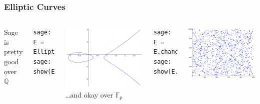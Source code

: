 \documentclass[10pt]{beamer}
\begin{document}
\begin{frame}
\frametitle{Elliptic Curves}

\begin{columns}
Sage is pretty good over $\mathbb{Q}$
\begin{lstlisting}
sage: E = EllipticCurve("37a")
sage: show(E.plot())
\end{lstlisting}
\includegraphics[width=1\textwidth]{elliptic_curve_over_q.png}
\dots and okay over  $\mathbb{F}_p$
\begin{lstlisting}
sage: E = E.change_ring(GF(997))
sage: show(E.plot())
\end{lstlisting}
\includegraphics[width=1\textwidth]{elliptic_curve_mod_q.png}
\end{columns}


\end{frame}
\end{document}
